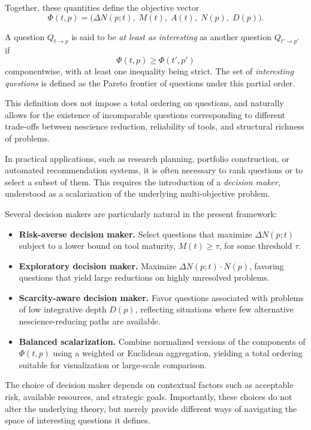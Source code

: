 Together, these quantities define the objective vector
\[
\Phi(t,p) = \bigl( \Delta N(p;t),\; M(t),\; A(t),\; N(p),\; D(p) \bigr).
\]

\begin{definition}
A question $Q_{t \to p}$ is said to be \emph{at least as interesting} as another question $Q_{t' \to p'}$ if
\[
\Phi(t,p) \ge \Phi(t',p')
\]
componentwise, with at least one inequality being strict. The set of \emph{interesting questions} is defined as the Pareto frontier of questions under this partial order.
\end{definition}

\noindent
This definition does not impose a total ordering on questions, and naturally allows for the existence of incomparable questions corresponding to different trade-offs between nescience reduction, reliability of tools, and structural richness of problems.

In practical applications, such as research planning, portfolio construction, or automated recommendation systems, it is often necessary to rank questions or to select a subset of them. This requires the introduction of a \emph{decision maker}, understood as a scalarization of the underlying multi-objective problem.

Several decision makers are particularly natural in the present framework:

\begin{itemize}
\item \textbf{Risk-averse decision maker.} Select questions that maximize $\Delta N(p;t)$ subject to a lower bound on tool maturity, $M(t) \ge \tau$, for some threshold $\tau$.
\item \textbf{Exploratory decision maker.} Maximize $\Delta N(p;t) \cdot N(p)$, favoring questions that yield large reductions on highly unresolved problems.
\item \textbf{Scarcity-aware decision maker.} Favor questions associated with problems of low integrative depth $D(p)$, reflecting situations where few alternative nescience-reducing paths are available.
\item \textbf{Balanced scalarization.} Combine normalized versions of the components of $\Phi(t,p)$ using a weighted or Euclidean aggregation, yielding a total ordering suitable for visualization or large-scale comparison.
\end{itemize}

\noindent
The choice of decision maker depends on contextual factors such as acceptable risk, available resources, and strategic goals. Importantly, these choices do not alter the underlying theory, but merely provide different ways of navigating the space of interesting questions it defines.

